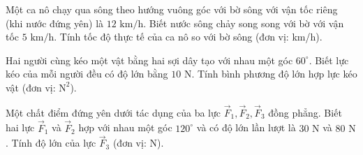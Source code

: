 \begin{bt}%
	Một ca nô chạy qua sông theo hướng vuông góc với bờ sông với vận tốc riêng (khi nước đứng yên) là $12\text{ km/h}$. Biết nước sông chảy song song với bờ với vận tốc $5\text{ km/h}$. Tính tốc độ thực tế của ca nô so với bờ sông (đơn vị: km/h).
\end{bt}

\begin{bt}%
	Hai người cùng kéo một vật bằng hai sợi dây tạo với nhau một góc $60^\circ$. Biết lực kéo của mỗi người đều có độ lớn bằng $10\text{ N}$. Tính bình phương độ lớn hợp lực kéo vật (đơn vị: $\text{N}^2$).
\end{bt}

\begin{bt}%
	Một chất điểm đứng yên dưới tác dụng của ba lực $\overrightarrow{F}_1, \overrightarrow{F}_2, \overrightarrow{F}_3$ đồng phẳng. Biết hai lực $\overrightarrow{F}_1$ và $\overrightarrow{F}_2$ hợp với nhau một góc $120^\circ$ và có độ lớn lần lượt là $30\text{ N}$ và $80\text{ N}$. Tính độ lớn của lực $\overrightarrow{F}_3$ (đơn vị: N).
\end{bt}

